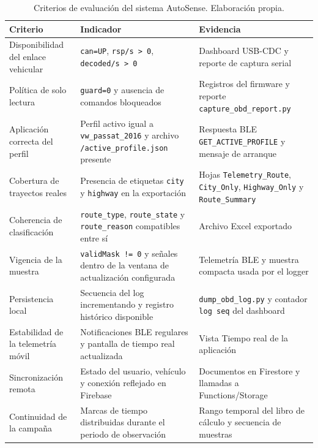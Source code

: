 \documentclass[12pt,letterpaper]{report}
\begin{document}
\begin{table}[!htbp]
\centering
\caption{Criterios de evaluación del sistema AutoSense. Elaboración propia.}
\label{tab:criterios-evaluacion}
\renewcommand{\arraystretch}{1.08}
\small
\begin{tabular}{p{}p{}p{}}
\toprule
Criterio & Indicador & Evidencia \\
\midrule
Disponibilidad del enlace vehicular & \texttt{can=UP}, \texttt{rsp/s > 0}, \texttt{decoded/s > 0} & Dashboard USB-CDC y reporte de captura serial \\
Política de solo lectura & \texttt{guard=0} y ausencia de comandos bloqueados & Registros del firmware y reporte \texttt{capture\_obd\_report.py} \\
Aplicación correcta del perfil & Perfil activo igual a \texttt{vw\_passat\_2016} y archivo \texttt{/active\_profile.json} presente & Respuesta BLE \texttt{GET\_ACTIVE\_PROFILE} y mensaje de arranque \\
Cobertura de trayectos reales & Presencia de etiquetas \texttt{city} y \texttt{highway} en la exportación & Hojas \texttt{Telemetry\_Route}, \texttt{City\_Only}, \texttt{Highway\_Only} y \texttt{Route\_Summary} \\
Coherencia de clasificación & \texttt{route\_type}, \texttt{route\_state} y \texttt{route\_reason} compatibles entre sí & Archivo Excel exportado \\
Vigencia de la muestra & \texttt{validMask != 0} y señales dentro de la ventana de actualización configurada & Telemetría BLE y muestra compacta usada por el logger \\
Persistencia local & Secuencia del log incrementando y registro histórico disponible & \texttt{dump\_obd\_log.py} y contador \texttt{log seq} del dashboard \\
Estabilidad de la telemetría móvil & Notificaciones BLE regulares y pantalla de tiempo real actualizada & Vista Tiempo real de la aplicación \\
Sincronización remota & Estado del usuario, vehículo y conexión reflejado en Firebase & Documentos en Firestore y llamadas a Functions/Storage \\
Continuidad de la campaña & Marcas de tiempo distribuidas durante el periodo de observación & Rango temporal del libro de cálculo y secuencia de muestras \\
\bottomrule
\end{tabular}
\end{table}
\end{document}
